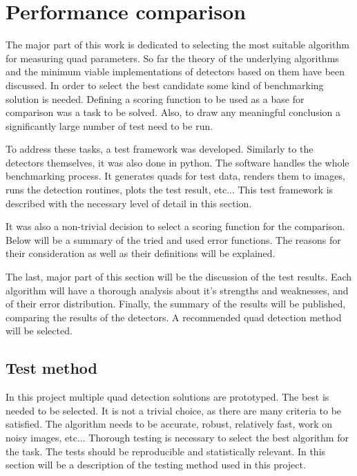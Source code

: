 \section{Performance comparison}

The major part of this work is dedicated to selecting the most suitable algorithm for measuring quad parameters.
So far the theory of the underlying algorithms and the minimum viable implementations of detectors based on them have been discussed.
In order to select the best candidate some kind of benchmarking solution is needed.
Defining a scoring function to be used as a base for comparison was a task to be solved.
Also, to draw any meaningful conclusion a significantly large number of test need to be run.

To address these tasks, a test framework was developed.
Similarly to the detectors themselves, it was also done in python.
The software handles the whole benchmarking process.
It generates quads for test data, renders them to images, runs the detection routines, plots the test result, etc...
This test framework is described with the necessary level of detail in this section.

It was also a non-trivial decision to select a scoring function for the comparison.
Below will be a summary of the tried and used error functions.
The reasons for their consideration as well as their definitions will be explained.

The last, major part of this section will be the discussion of the test results.
Each algorithm will have a thorough analysis about it's strengths and weaknesses, and of their error distribution.
Finally, the summary of the results will be published, comparing the results of the detectors.
A recommended quad detection method will be selected.

\subsection{Test method}

In this project multiple quad detection solutions are prototyped.
The best is needed to be selected.
It is not a trivial choice, as there are many criteria to be satisfied.
The algorithm needs to be accurate, robust, relatively fast, work on noisy images, etc...
Thorough testing is necessary to select the best algorithm for the task.
The tests should be reproducible and statistically relevant.
In this section will be a description of the testing method used in this project.

